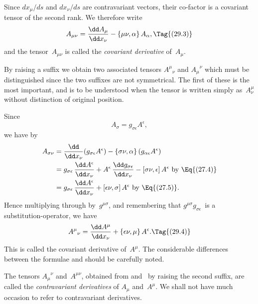 \documentclass[12pt]{book}
\begin{document}
Since $dx_{\mu}/ds$ and $dx_{\nu}/ds$ are contravariant vectors, their co-factor is a
covariant tensor of the second rank. We therefore write
\[
A_{\mu\nu} = \frac{\dd A_{\mu}}{\dd x_{\nu}} - \{\mu\nu, \alpha\}\, A_{\alpha},
\Tag{(29.3)}
\]
and the tensor~$A_{\mu\nu}$ is called the \emph{covariant derivative} of~$A_{\mu}$.

By raising a suffix we obtain two associated tensors ${A^{\mu}}_{\nu}$ and ${A_{\mu}}^{\nu}$ which
must be distinguished since the two suffixes are not symmetrical. The first
of these is the most important, and is to be understood when the tensor
is written simply as~$A_{\nu}^{\mu}$ without distinction of original position.

Since
\[
A_{\sigma} = g_{\sigma\epsilon} A^{\epsilon},
\]
we have by~
\begin{align*}
  A_{\sigma\nu}
  &= \frac{\dd}{\dd x_{\nu}} (g_{\sigma\epsilon} A^{\epsilon}) - \{\sigma\nu, \alpha\}\, (g_{\alpha\epsilon} A^{\epsilon}) \\
  &= g_{\sigma\epsilon}\, \frac{\dd A^{\epsilon}}{\dd x_{\nu}} + A^{\epsilon}\, \frac{\dd g_{\sigma\epsilon}}{\dd x_{\nu}} - [\sigma\nu, \epsilon]\, A^{\epsilon} \text{ by~\Eq{(27.4)}} \\
  &= g_{\sigma\epsilon}\, \frac{\dd A^{\epsilon}}{\dd x_{\nu}} + [\epsilon\nu, \sigma]\, A^{\epsilon} \text{ by~\Eq{(27.5)}.}
\end{align*}
Hence multiplying through by~$g^{\mu\sigma}$, and remembering that $g^{\mu\sigma}g_{\sigma\epsilon}$~is a
substitution-operator, we have
\[
{A^{\mu}}_{\nu} = \frac{\dd A^{\mu}}{\dd x_{\nu}} + \{\epsilon\nu, \mu\}\, A^{\epsilon}.
\Tag{(29.4)}
\]
This is called the covariant derivative of~$A^{\mu}$. The considerable differences
%
%
%
between the formulae  and  should be carefully noted.

The tensors ${A_{\mu}}^{\nu}$ and~$A^{\mu\nu}$, obtained from  and~ by raising the
second suffix, are called the \emph{contravariant derivatives} of $A_{\mu}$ and~$A^{\mu}$. We shall
%
not have much occasion to refer to contravariant derivatives.

\end{document}

